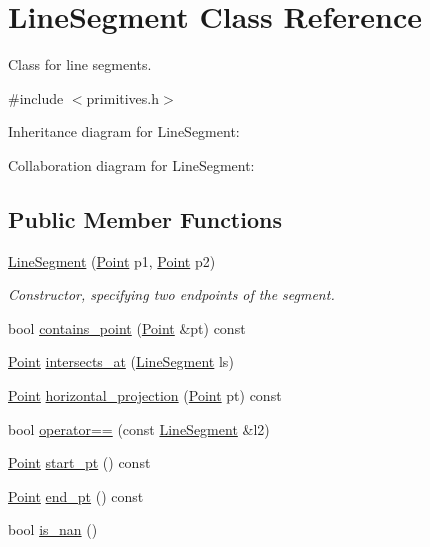 \hypertarget{classLineSegment}{}\section{Line\+Segment Class Reference}
\label{classLineSegment}


Class for line segments.  




{\ttfamily \#include $<$primitives.\+h$>$}



Inheritance diagram for Line\+Segment\+:


Collaboration diagram for Line\+Segment\+:
\subsection*{Public Member Functions}
\begin{DoxyCompactItemize}
\item 
\hyperlink{classLineSegment_a691e185edf3aa7e2dc12307f9ef4be6b}{Line\+Segment} (\hyperlink{classPoint}{Point} p1, \hyperlink{classPoint}{Point} p2)
\begin{DoxyCompactList}\small\item\em Constructor, specifying two endpoints of the segment. \end{DoxyCompactList}\item 
bool \hyperlink{classLineSegment_a1b18c795d8c3c6f2724074062967671e}{contains\+\_\+point} (\hyperlink{classPoint}{Point} \&pt) const
\item 
\hyperlink{classPoint}{Point} \hyperlink{classLineSegment_a3bdc73ce4696a76b7c7dd143556c95b6}{intersects\+\_\+at} (\hyperlink{classLineSegment}{Line\+Segment} ls)
\item 
\hyperlink{classPoint}{Point} \hyperlink{classLineSegment_a51a9d2fcca6b3ff03cb51fd4d8fae4ba}{horizontal\+\_\+projection} (\hyperlink{classPoint}{Point} pt) const
\item 
bool \hyperlink{classLineSegment_ae73906b7230adbccf243c4b8dc6482b3}{operator==} (const \hyperlink{classLineSegment}{Line\+Segment} \&l2)
\item 
\hyperlink{classPoint}{Point} \hyperlink{classLineSegment_abe9136323cfe46be663907cbc1e3da2d}{start\+\_\+pt} () const
\item 
\hyperlink{classPoint}{Point} \hyperlink{classLineSegment_aa6c90340de500bb72bdde2114f838d57}{end\+\_\+pt} () const
\item 
bool \hyperlink{classLineSegment_a3364f7089cf7b650efe389475ddd0f12}{is\+\_\+nan} ()
\end{DoxyCompactItemize}
